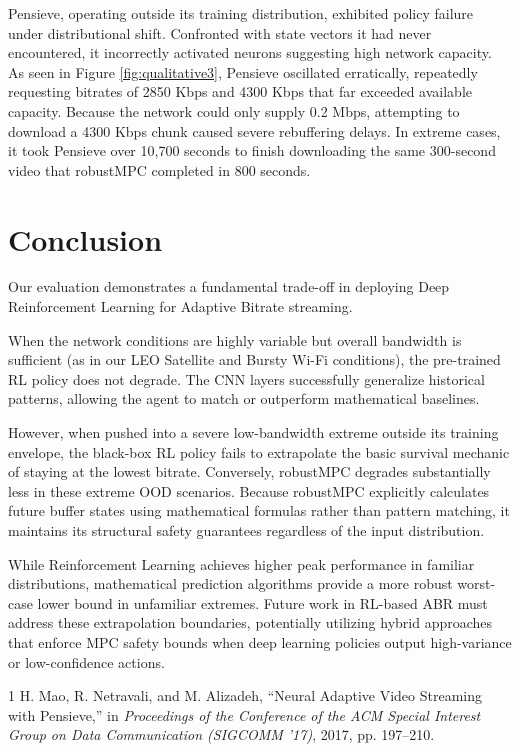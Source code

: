 \documentclass[10pt, conference, compsocconf]{IEEEtran}
\begin{document}
Pensieve, operating outside its training distribution, exhibited policy failure under distributional shift. Confronted with state vectors it had never encountered, it incorrectly activated neurons suggesting high network capacity. As seen in Figure \ref{fig:qualitative3}, Pensieve oscillated erratically, repeatedly requesting bitrates of 2850 Kbps and 4300 Kbps that far exceeded available capacity. Because the network could only supply 0.2 Mbps, attempting to download a 4300 Kbps chunk caused severe rebuffering delays. In extreme cases, it took Pensieve over 10,700 seconds to finish downloading the same 300-second video that robustMPC completed in 800 seconds.

\section{Conclusion}

Our evaluation demonstrates a fundamental trade-off in deploying Deep Reinforcement Learning for Adaptive Bitrate streaming.

When the network conditions are highly variable but overall bandwidth is sufficient (as in our LEO Satellite and Bursty Wi-Fi conditions), the pre-trained RL policy does not degrade. The CNN layers successfully generalize historical patterns, allowing the agent to match or outperform mathematical baselines.

However, when pushed into a severe low-bandwidth extreme outside its training envelope, the black-box RL policy fails to extrapolate the basic survival mechanic of staying at the lowest bitrate. Conversely, robustMPC degrades substantially less in these extreme OOD scenarios. Because robustMPC explicitly calculates future buffer states using mathematical formulas rather than pattern matching, it maintains its structural safety guarantees regardless of the input distribution.

While Reinforcement Learning achieves higher peak performance in familiar distributions, mathematical prediction algorithms provide a more robust worst-case lower bound in unfamiliar extremes. Future work in RL-based ABR must address these extrapolation boundaries, potentially utilizing hybrid approaches that enforce MPC safety bounds when deep learning policies output high-variance or low-confidence actions.


\begin{thebibliography}{1}
H. Mao, R. Netravali, and M. Alizadeh, ``Neural Adaptive Video Streaming with Pensieve,'' in \textit{Proceedings of the Conference of the ACM Special Interest Group on Data Communication (SIGCOMM '17)}, 2017, pp. 197--210.
\end{thebibliography}
\end{document}
